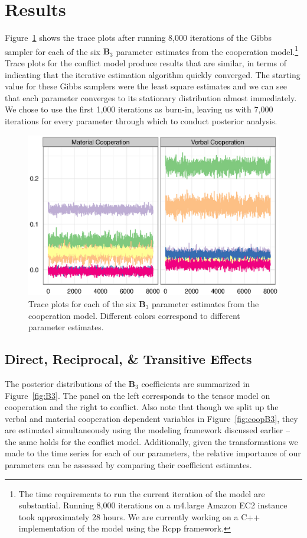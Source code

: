 \documentclass[3p,times,twocolumn,authoryear,12pt]{elsarticle}
\newcommand{\bl}[1]{{\mathbf #1}}
\begin{document}
\section{Results}

Figure~\ref{fig:trace} shows the trace plots after running 8,000 iterations of the Gibbs sampler for each of the six $\bl B_3$ parameter estimates from the cooperation model.\footnote{The time requirements to run the current iteration of the model are substantial. Running 8,000 iterations on a m4.large Amazon EC2 instance took approximately 28 hours. We are currently working on a C++ implementation of the model using the Rcpp framework.} Trace plots for the conflict model produce results that are similar, in terms of indicating that the iterative estimation algorithm quickly converged. The starting value for these Gibbs samplers were the least square estimates and we can see that each parameter converges to its stationary distribution almost immediately. We chose to use the first 1,000 iterations as burn-in, leaving us with 7,000 iterations for every parameter through which to conduct posterior analysis.

\begin{figure}[ht]
	\centering
	\includegraphics[width=.45\textwidth]{Coop_trace}
	\caption{Trace plots for each of the six $\bl B_3$ parameter estimates from the cooperation model. Different colors correspond to different parameter estimates.}
	\label{fig:trace}
\end{figure}

\subsection{Direct, Reciprocal, \& Transitive Effects}

The posterior distributions of the $\bl B_3$ coefficients are summarized in Figure~\ref{fig:B3}. The panel on the left corresponds to the tensor model on cooperation and the right to conflict. Also note that though we split up the verbal and material cooperation dependent variables in Figure~\ref{fig:coopB3}, they are estimated simultaneously using the modeling framework discussed earlier -- the same holds for the conflict model. Additionally, given the transformations we made to the time series for each of our parameters, the relative importance of our parameters can be assessed by comparing their coefficient estimates.
\end{document}
